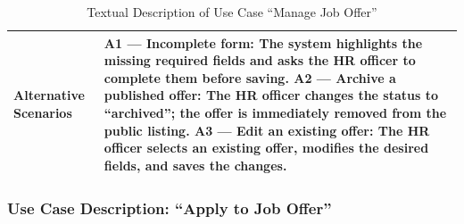 \begin{table}[H]
\begin{tabularx}{\textwidth}{|>{\bfseries\arraybackslash}p{4cm}|X|}
\hline
Alternative Scenarios &
\textbf{A1 --- Incomplete form:} The system highlights the missing required fields and asks the HR officer to complete them before saving. \newline
\textbf{A2 --- Archive a published offer:} The HR officer changes the status to ``archived''; the offer is immediately removed from the public listing. \newline
\textbf{A3 --- Edit an existing offer:} The HR officer selects an existing offer, modifies the desired fields, and saves the changes. \\
\hline
\end{tabularx}
\caption{Textual Description of Use Case ``Manage Job Offer''}
\label{tab:uc-manageoffer}
\end{table}
\normalsize
\setlength{\tabcolsep}{6pt}
\renewcommand{\arraystretch}{1}

\subsubsection{Use Case Description: ``Apply to Job Offer''}


